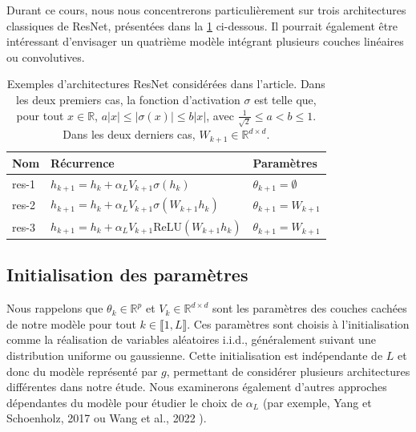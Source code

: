 Durant ce cours, nous nous concentrerons particulièrement sur trois architectures classiques de ResNet, présentées dans la \cref{tab:resnet_architectures} ci-dessous. Il pourrait également être intéressant d'envisager un quatrième modèle intégrant plusieurs couches linéaires ou convolutives.

\begin{table}[H]
    \centering
    \begin{tabular}{lll}
        \hline
        \textbf{Nom} & \textbf{Récurrence} & \textbf{Paramètres} \\ \hline
        res-1 & \( h_{k+1} = h_k + \alpha_L V_{k+1}\sigma(h_k) \) & \( \theta_{k+1} = \emptyset \) \\
        res-2 & \( h_{k+1} = h_k + \alpha_L V_{k+1}\sigma(W_{k+1}h_k) \) & \( \theta_{k+1} = W_{k+1} \) \\
        res-3 & \( h_{k+1} = h_k + \alpha_L V_{k+1}\text{ReLU}(W_{k+1}h_k) \) & \( \theta_{k+1} = W_{k+1} \) \\ \hline
    \end{tabular}
    \caption{Exemples d'architectures ResNet considérées dans l'article. Dans les deux premiers cas, la fonction d'activation \( \sigma \) est telle que, pour tout \( x \in \mathbb{R} \), \( a|x| \leq |\sigma(x)| \leq b|x| \), avec \( \frac{1}{\sqrt{2}} \leq a < b \leq 1 \). Dans les deux derniers cas, \( W_{k+1} \in \mathbb{R}^{d \times d} \).}
    \label{tab:resnet_architectures}
\end{table}

\subsection*{Initialisation des paramètres} 
Nous rappelons que $\theta_k \in \mathbb{R}^p$ et $V_k \in \mathbb{R}^{d \times d}$ sont les paramètres des couches cachées de notre modèle pour tout $k \in \llbracket 1, L \rrbracket$. Ces paramètres sont choisis à l'initialisation comme la réalisation de variables aléatoires i.i.d., généralement suivant une distribution uniforme ou gaussienne. Cette initialisation est indépendante de $L$ et donc du modèle représenté par $g$, permettant de considérer plusieurs architectures différentes dans notre étude. Nous examinerons également d'autres approches dépendantes du modèle pour étudier le choix de $\alpha_L$ (par exemple, Yang et Schoenholz, 2017 ou Wang et al., 2022 \cite{torchvision2016}).


